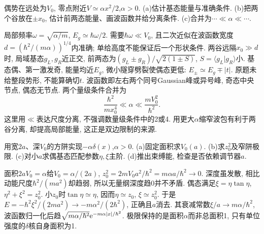 \begin{exercise}
偶势在远处为$V_0$, 零点附近$V\simeq\alpha x^2/2$,$\alpha>0$. (a)估计基态能量与准确条件. (b)把两个谷放在$\pm x_0$, 估计前两态能量、画波函数并给分离条件. (c)合并为$\cdots\ll\alpha\ll\cdots$.
\end{exercise}
\begin{solution}
局部频率$\omega=\sqrt{\alpha/m}$, $E_g\simeq\hbar\omega/2$. 需要$\hbar\omega\ll V_0$, 且二次近似在波函数宽度$d=(\hbar^2/(m\alpha))^{1/4}$内准确; 单给高度不能保证后一个形状条件. 两谷远隔$x_0\gg d$时, 局域基态$g_L,g_R$近正交, 前两态为$(g_L\pm g_R)/\sqrt{2(1\pm S)}$, $S=\langle g_L|g_R\rangle$小. 基态偶、第一激发奇, 能量均近$E_g$, 微小隧穿劈裂使偶态更低: $E_\pm\simeq E_g\mp|t|$. 原题未给整段势形, 不能算确切$t$. 波函数即左右两个同号Gaussian峰或异号峰, 奇态中央节点, 偶态无节点. 两个量级条件合并为
\[
\frac{\hbar^2}{mx_0^4}\ll\alpha\ll\frac{mV_0^2}{\hbar^2}.
\]
这里用$\ll$表达尺度分离, 不强调数量级条件中的2或4. 用更大$\alpha$缩窄波包有利于两谷分离, 却提高局部能量, 这正是双边限制的来源.
\begin{center}\end{center}
\end{solution}
\begin{exercise}
用宽$2a$、深$V_0$的方阱实现$-\alpha\delta(x)$,$\alpha>0$. (a)固定面积求$V_0(a)$. (b)求$z_0^2$及窄阱极限. (c)对小$a$求偶基态匹配参数$\eta,\xi$主阶. (d)推出束缚能, 检查是否依赖调节器$a$.
\end{exercise}
\begin{solution}
面积$2aV_0=\alpha$给$V_0=\alpha/(2a)$, $z_0^2=2mV_0a^2/\hbar^2=m\alpha a/\hbar^2\to0$. 深度虽发散, 相比动能尺度$\hbar^2/(ma^2)$却趋弱, 所以无量纲深度趋0并不矛盾. 偶态满足$\xi=\eta\tan\eta$,$\eta^2+\xi^2=z_0^2$. 小$z_0$时$\tan\eta\simeq\eta$, 因而$\eta\simeq z_0$, $\xi\simeq z_0^2$. 于是$E=-\hbar^2\xi^2/(2ma^2)\to-m\alpha^2/(2\hbar^2)$, 正确且$a$消去. 其衰减常数$\xi/a\to m\alpha/\hbar^2$, 波函数归一化后趋$\sqrt{m\alpha/\hbar^2}\mathrm e^{-m\alpha|x|/\hbar^2}$. 极限保持的是面积$\alpha$而非总面积1, 只有单位强度的$\delta$核自身面积为1.
\end{solution}
